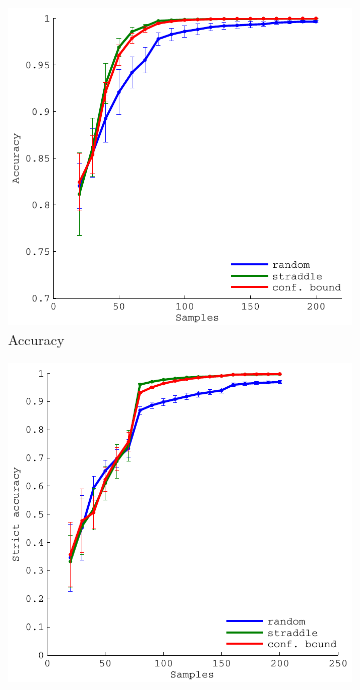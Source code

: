 \documentclass[11pt]{article} %
\begin{document}
\begin{figure}[tb]
  \begin{subfigure}[b]{0.329\textwidth}
    \centering
    \includegraphics[width=\textwidth]{figures/sin2d_acc}
    \caption{Accuracy}
  \end{subfigure}
  \hfill
  \begin{subfigure}[b]{0.329\textwidth}
    \centering
    \includegraphics[width=\textwidth]{figures/sin2d_strict_acc}

\end{subfigure}
\end{figure}
\end{document}
